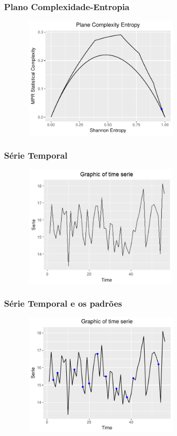 \documentclass[10pt, compress]{beamer}
\begin{document}
\begin{frame}[fragile]
\frametitle{ Plano Complexidade-Entropia}

\begin{figure}
  \centering
   \includegraphics[width=8cm,height=6cm]{Rplot3.pdf}
\end{figure}
\end{frame}

\begin{frame}[fragile]
\frametitle{ Série Temporal}

\begin{figure}
  \centering
   \includegraphics[width=8cm,height=6cm]{Rplot.pdf}
\end{figure}
\end{frame}

\begin{frame}[fragile]
\frametitle{ Série Temporal e os padrões}

\begin{figure}
  \centering
   \includegraphics[width=8cm,height=6cm]{Rplot04.pdf}
\end{figure}
\end{frame}
\end{document}
